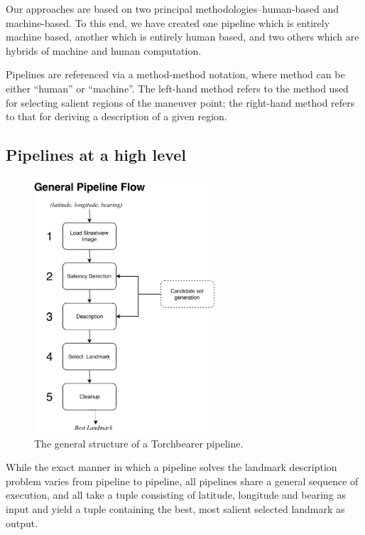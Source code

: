 Our approaches are based on two principal methodologies--human-based and machine-based. To this end, we have created one pipeline which is entirely machine based, another which is entirely human based, and two others which are hybrids of machine and human computation.

Pipelines are referenced via a method-method notation, where method can be either “human” or “machine”. The left-hand method refers to the method used for selecting salient regions of the maneuver point; the right-hand method refers to that for deriving a description of a given region.

\subsection{Pipelines at a high level}
	
\begin{figure}[htbp]
  \centering
  \includegraphics[width=0.6\textwidth]{pipeline_diagrams/general.pdf}
  \caption{The general structure of a Torchbearer pipeline.}
  \label{fig:pipeline:overview}
\end{figure}

While the exact manner in which a pipeline solves the landmark description problem varies from pipeline to pipeline, all pipelines share a general sequence of execution, and all take a tuple consisting of latitude, longitude and bearing as input and yield a tuple containing the best, most salient selected landmark as output.

